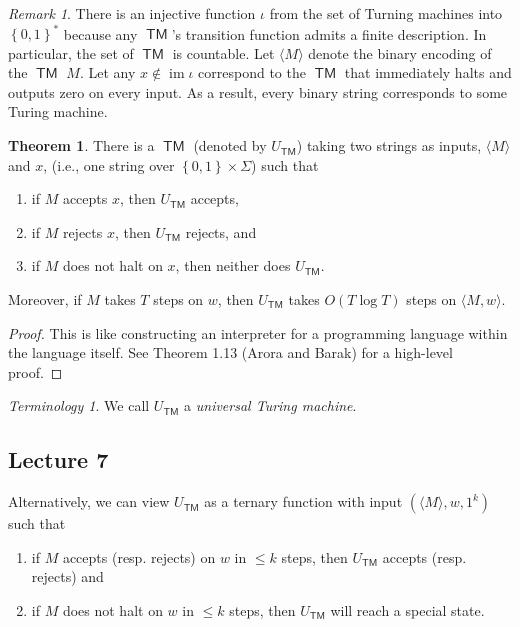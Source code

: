 \documentclass[10pt,letterpaper,cm]{nupset}
\theoremstyle{definition}
\theoremstyle{theorem}
\newtheorem{theorem}[definition]{Theorem}
\theoremstyle{remark}
\newtheorem{remark}[definition]{Remark}
\newtheorem*{term}{Terminology}
\newcommand{\1}{\mathbf{1}}
\newcommand{\0}{\vec 0}
\DeclareMathOperator{\im}{im}
\DeclareMathOperator{\TM}{\mathsf{TM}}
\begin{document}
\begin{remark}
There is an injective function $\iota$ from the set of Turning machines into $\left\{0,1\right\}^{\ast}$ because any $\TM$'s transition function admits a finite description. In particular, the set of $\TM$ is countable. Let $\langle M \rangle $ denote the binary encoding of the $\TM$ $M$. Let any $x\notin \im{\iota}$ correspond to the $\TM$ that immediately halts and outputs zero on every input. As a result, every binary string corresponds to some Turing machine. 
\end{remark}

\begin{theorem}
 There is a $\TM$ (denoted by $U_{\TM}$) taking two strings as inputs, $\langle M \rangle$ and $x$, (i.e., one string over $\left\{0,1\right\} \times \Sigma$) such that
 \begin{enumerate}[label=(\alph*)]
 \item if $M$ accepts $x$, then $U_{\TM}$ accepts,
 \item if $M$ rejects $x$, then $U_{\TM}$ rejects, and
 \item if $M$ does not halt on $x$, then neither does $U_{\TM}$.
 \end{enumerate} Moreover, if $M$ takes $T$ steps on $w$, then $U_{\TM}$ takes $O(T \log{T})$ steps on $\langle M, w \rangle$.
\end{theorem}
\begin{proof}
This is like constructing an interpreter for a programming language within the language itself. See Theorem 1.13 (Arora and Barak) for a high-level proof.
\end{proof}

\begin{term}
We call $U_{\TM}$ a \textit{universal Turing machine}.
\end{term}

\subsection{Lecture 7}


Alternatively, we can view $U_{\TM}$ as a ternary function with input $(\langle M \rangle,  w, 1^k)$ such that
\begin{enumerate}[label=(\roman*)]
\item if $M$ accepts (resp. rejects) on $w$ in $\leq k$ steps, then $U_{\TM}$ accepts (resp. rejects) and
\item if $M$ does not halt on $w$ in $\leq k$ steps, then $U_{\TM}$ will reach a special state.
\end{enumerate}
\end{document}
